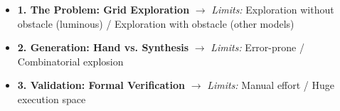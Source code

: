 \begin{frame}{}

\begin{itemize}
  \item<1-> \textbf{1. The Problem: Grid Exploration}
        \newline {\footnotesize\textcolor{softgray}{[Bramas et al. 2021, Sardar et al. 2024, ...]}}
        \newline $\rightarrow$ \textit{Limits:} Exploration without obstacle (luminous) / Exploration with obstacle (other models)
  \vspace{0.4cm}

  \item<2-> \textbf{2. Generation: Hand vs. Synthesis}
        \newline {\footnotesize\textcolor{softgray}{[Bonnet et al. 2014, Millet et al. 2014, ...]}}
        \newline $\rightarrow$ \textit{Limits:} Error-prone / Combinatorial explosion
  \vspace{0.4cm}

  \item<3-> \textbf{3. Validation: Formal Verification}
        \newline {\footnotesize\textcolor{softgray}{[Bérard et al. 2016, Courtieu et al. 2022, ...]}}
        \newline $\rightarrow$ \textit{Limits:} Manual effort / Huge execution space
\end{itemize}

\end{frame}
